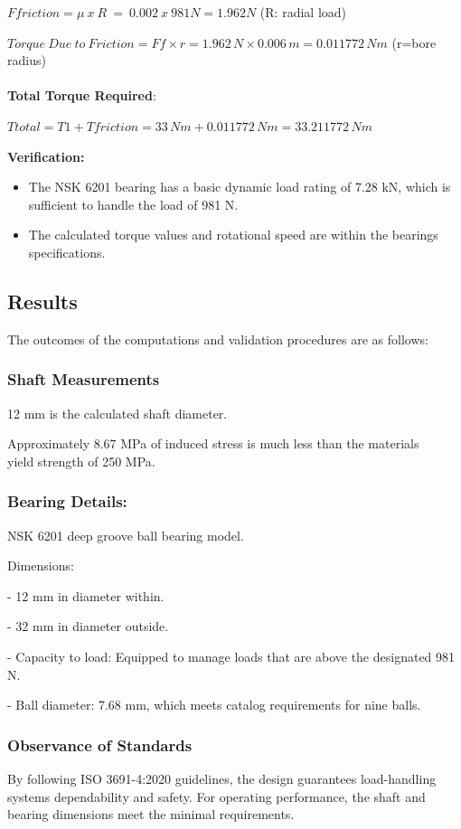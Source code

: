 \documentclass[../../main]{subfiles}
\begin{document}
\(Ffriction = \mu\ x\ R\  = \ 0.002\ x\ 981N = 1.962N\) (R: radial load)

\(Torque\ Due\ to\ Friction = Ff \times r = 1.962\, N \times 0.006\, m = 0.011772\, Nm\)
(r=bore radius)
\\ \\
\textbf{Total Torque Required}:

\(Ttotal = T1 + Tfriction = 33\, Nm + 0.011772\, Nm = 33.211772\, Nm\)

\textbf{Verification:}

\begin{itemize}
\item
  The NSK 6201 bearing has a basic dynamic load rating of 7.28 kN, which
  is sufficient to handle the load of 981 N.
\item
  The calculated torque values and rotational speed are within the
  bearing\textquotesingle s specifications.
\end{itemize}

\subsection{Results}

The outcomes of the computations and validation procedures are as
follows:

\subsubsection{Shaft Measurements}

12 mm is the calculated shaft diameter.

Approximately 8.67 MPa of induced stress is much less than the
material\textquotesingle s \\ yield strength of 250 MPa.

\subsubsection{Bearing Details:}
NSK 6201 deep groove ball bearing model.

Dimensions:

- 12 mm in diameter within.

- 32 mm in diameter outside.

- Capacity to load: Equipped to manage loads that are above the
designated 981 N.

- Ball diameter: 7.68 mm, which meets catalog requirements for nine
balls.

\subsubsection{Observance of Standards}
By following ISO 3691-4:2020 guidelines, the design guarantees
load-handling systems\textquotesingle{} dependability and safety. For
operating performance, the shaft and bearing dimensions meet the minimal
requirements.
\end{document}
